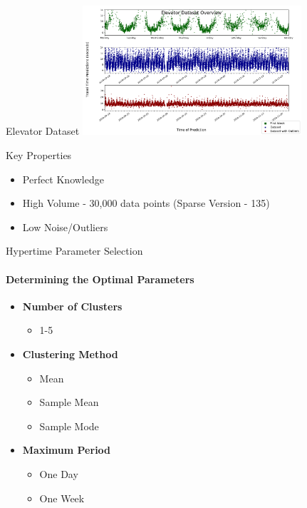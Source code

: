 \documentclass{beamer}
\begin{document}
\begin{frame}[t]{Elevator Dataset}
  \centering
  \vspace*{-0.33cm}
  {\includegraphics[width=3.2in]{images/data_overview/elevator_dataset_overview.png}}
  \vspace*{-0.20cm}

  \begin{block}{Key Properties}
    \begin{itemize}
      \item Perfect Knowledge
      \item High Volume - 30,000 data points (Sparse Version - 135)
      \item Low Noise/Outliers
    \end{itemize}
  \end{block}

\end{frame}



\begin{frame}[t]{Hypertime Parameter Selection}
  \framesubtitle{Determining the Optimal Parameters}
  \begin{itemize}
    \setlength\itemsep{1em}

  \item \textbf{Number of Clusters}
    \begin{itemize}
      \item 1-5
    \end{itemize}
  \item \textbf{Clustering Method}
    \begin{itemize}
      \item Mean
      \item Sample Mean
      \item Sample Mode
    \end{itemize}
  \item \textbf{Maximum Period}
    \begin{itemize}
      \item One Day
      \item One Week
    \end{itemize}
  \end{itemize}
\end{frame}
\end{document}
